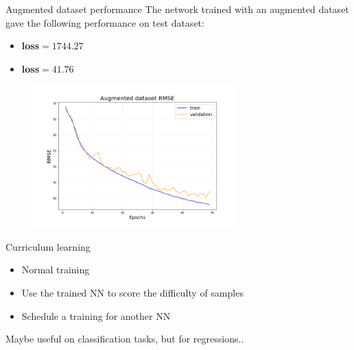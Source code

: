 \documentclass{beamer}
\begin{document}
\begin{frame}{Augmented dataset performance}
    The network trained with an augmented dataset gave the following performance on test dataset:
    \begin{itemize}
        \item[\textbullet] \textbf{loss}$=1744.27$
        \item[\textbullet] \textbf{loss}$=41.76$
    \end{itemize}

        \begin{figure}
            \centering
            \includegraphics[width=0.7\textwidth]{figures/lstmenc_aug_rmse.png}
        \end{figure}

\end{frame}



\begin{frame}{Curriculum learning}
    \begin{itemize}
        \item Normal training
        \item Use the trained NN to score the difficulty of samples
        \item Schedule a training for another NN
    \end{itemize}
    \vfill
    Maybe useful on classification tasks, but for regressions..
\end{frame}
\end{document}
